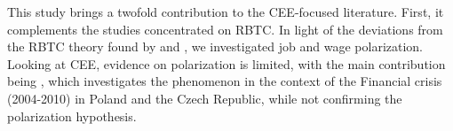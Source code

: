 \documentclass[11pt]{article}
\begin{document}


This study brings a twofold contribution to the CEE-focused literature. First, it complements the studies concentrated on RBTC. In light of the deviations from the RBTC theory found by \citet{arendt2019technical} and \citet{hardy2018educational}, we investigated job and wage polarization. Looking at CEE, evidence on polarization is limited, with the main contribution being \cite{mysikova2018personal}, which investigates the phenomenon in the context of the Financial crisis (2004-2010) in Poland and the Czech Republic, while not confirming the polarization hypothesis.
\end{document}
